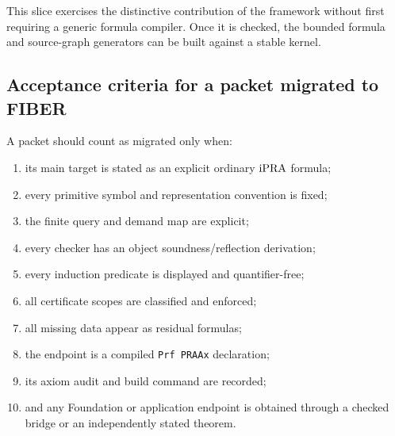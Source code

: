 This slice exercises the distinctive contribution of the framework without
first requiring a generic formula compiler.  Once it is checked, the bounded
formula and source-graph generators can be built against a stable kernel.

\subsection{Acceptance criteria for a packet migrated to FIBER}

A packet should count as migrated only when:

\begin{enumerate}
\item its main target is stated as an explicit ordinary \(\mathrm{iPRA}\) formula;
\item every primitive symbol and representation convention is fixed;
\item the finite query and demand map are explicit;
\item every checker has an object soundness/reflection derivation;
\item every induction predicate is displayed and quantifier-free;
\item all certificate scopes are classified and enforced;
\item all missing data appear as residual formulas;
\item the endpoint is a compiled \texttt{Prf PRAAx} declaration;
\item its axiom audit and build command are recorded;
\item and any Foundation or application endpoint is obtained through a checked
      bridge or an independently stated theorem.
\end{enumerate}
